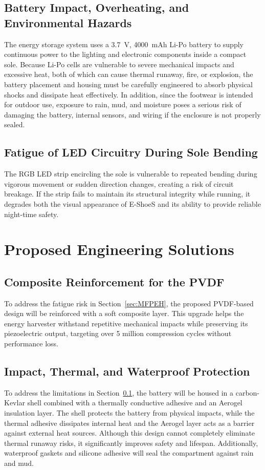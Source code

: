 \subsection{Battery Impact, Overheating, and Environmental Hazards}\label{sec:RBIO} %
The energy storage system uses a 3.7~V, 4000~mAh Li-Po battery to supply continuous power to the lighting and electronic components inside a compact sole. Because Li-Po cells are vulnerable to severe mechanical impacts and excessive heat, both of which can cause thermal runaway, fire, or explosion, the battery placement and housing must be carefully engineered to absorb physical shocks and dissipate heat effectively. In addition, since the footwear is intended for outdoor use, exposure to rain, mud, and moisture poses a serious risk of damaging the battery, internal sensors, and wiring if the enclosure is not properly sealed.

\subsection{Fatigue of LED Circuitry During Sole Bending}\label{sec:FLCDSB} %
The RGB LED strip encircling the sole is vulnerable to repeated bending during vigorous movement or sudden direction changes, creating a risk of circuit breakage. If the strip fails to maintain its structural integrity while running, it degrades both the visual appearance of E-ShoeS and its ability to provide reliable night-time safety.

\section{Proposed Engineering Solutions} %
\subsection{Composite Reinforcement for the PVDF} %
To address the fatigue risk in Section~\ref{sec:MFPEH}, the proposed PVDF-based design will be reinforced with a soft composite layer. This upgrade helps the energy harvester withstand repetitive mechanical impacts while preserving its piezoelectric output, targeting over 5 million compression cycles without performance loss.

\subsection{Impact, Thermal, and Waterproof Protection} %
To address the limitations in Section~\ref{sec:RBIO}, the battery will be housed in a carbon-Kevlar shell combined with a thermally conductive adhesive and an Aerogel insulation layer. The shell protects the battery from physical impacts, while the thermal adhesive dissipates internal heat and the Aerogel layer acts as a barrier against external heat sources. Although this design cannot completely eliminate thermal runaway risks, it significantly improves safety and lifespan. Additionally, waterproof gaskets and silicone adhesive will seal the compartment against rain and mud.

